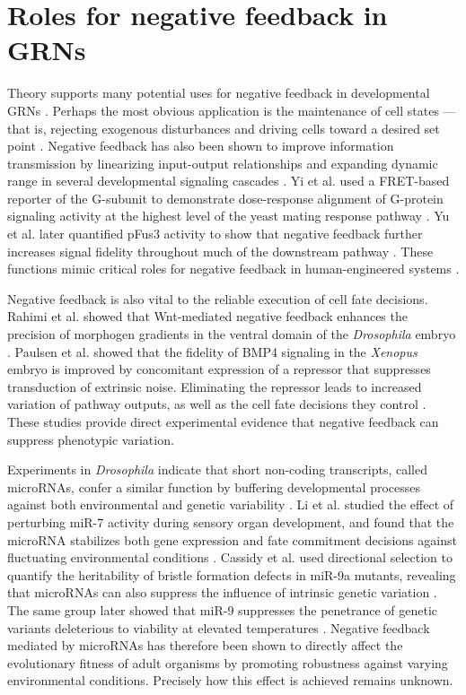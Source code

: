 \section{Roles for negative feedback in GRNs}
 
Theory supports many potential uses for negative feedback in developmental GRNs \cite{Freeman2000}. Perhaps the most obvious application is the maintenance of cell states --- that is, rejecting exogenous disturbances and driving cells toward a desired set point \cite{Alon2007,Behar2007,Yi2000}. Negative feedback has also been shown to improve information transmission by linearizing input-output relationships and expanding dynamic range in several developmental signaling cascades \cite{Bhalla2002,Cheong2011,Paulsen2011,Yi2003,Yu2008a}. Yi et al. used a FRET-based reporter of the G\textalpha-subunit to demonstrate dose-response alignment of G-protein signaling activity at the highest level of the yeast mating response pathway \cite{Yi2003}. Yu et al. later quantified pFus3 activity to show that negative feedback further increases signal fidelity throughout much of the downstream pathway \cite{Yu2008a}. These functions mimic critical roles for negative feedback in human-engineered systems \cite{Khammash2016}.

Negative feedback is also vital to the reliable execution of cell fate decisions. Rahimi et al. showed that Wnt-mediated negative feedback enhances the precision of morphogen gradients in the ventral domain of the \textit{Drosophila} embryo \cite{Rahimi2016}. Paulsen et al. showed that the fidelity of BMP4 signaling in the \textit{Xenopus} embryo is improved by concomitant expression of a repressor that suppresses transduction of extrinsic noise. Eliminating the repressor leads to increased variation of pathway outputs, as well as the cell fate decisions they control \cite{Paulsen2011}. These studies provide direct experimental evidence that negative feedback can suppress phenotypic variation. 

Experiments in \emph{Drosophila} indicate that short non-coding transcripts, called microRNAs, confer a similar function by buffering developmental processes against both environmental and genetic variability \cite{Cassidy2016a,Cassidy2013,Li2009b,Ebert2012}. Li et al. studied the effect of perturbing miR-7 activity during sensory organ development, and found that the microRNA stabilizes both gene expression and fate commitment decisions against fluctuating environmental conditions \cite{Li2009b}. Cassidy et al. used directional selection to quantify the heritability of bristle formation defects in miR-9a mutants, revealing that microRNAs can also suppress the influence of intrinsic genetic variation \cite{Cassidy2013}. The same group later showed that miR-9 suppresses the penetrance of genetic variants deleterious to viability at elevated temperatures \cite{Cassidy2016a}. Negative feedback mediated by microRNAs has therefore been shown to directly affect the evolutionary fitness of adult organisms by promoting robustness against varying environmental conditions. Precisely how this effect is achieved remains unknown.

